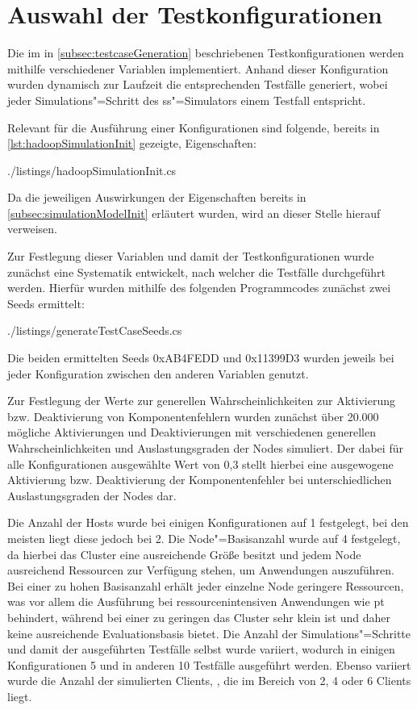 \section{Auswahl der Testkonfigurationen}
\label{sec:selectTestcases}

Die im in \autoref{subsec:testcaseGeneration} beschriebenen Testkonfigurationen werden mithilfe verschiedener Variablen implementiert.
Anhand dieser Konfiguration wurden dynamisch zur Laufzeit die entsprechenden Testfälle generiert, wobei jeder Simulations"=Schritt des \ac{ss}"=Simulators einem Testfall entspricht.

Relevant für die Ausführung einer Konfigurationen sind folgende, bereits in \autoref{lst:hadoopSimulationInit} gezeigte, Eigenschaften:


{./listings/hadoopSimulationInit.cs}

Da die jeweiligen Auswirkungen der Eigenschaften bereits in \autoref{subsec:simulationModelInit} erläutert wurden, wird an dieser Stelle hierauf verweisen.

Zur Festlegung dieser Variablen und damit der Testkonfigurationen wurde zunächst eine Systematik entwickelt, nach welcher die Testfälle durchgeführt werden.
Hierfür wurden mithilfe des folgenden Programmcodes zunächst zwei Seeds ermittelt:


{./listings/generateTestCaseSeeds.cs}

Die beiden ermittelten Seeds 0xAB4FEDD und 0x11399D3 wurden jeweils bei jeder Konfiguration zwischen den anderen Variablen genutzt.

Zur Festlegung der Werte zur generellen Wahrscheinlichkeiten zur Aktivierung bzw. Deaktivierung von Komponentenfehlern wurden zunächst über 20.000 mögliche Aktivierungen und Deaktivierungen mit verschiedenen generellen Wahrscheinlichkeiten und Auslastungsgraden der Nodes simuliert.
Der dabei für alle Konfigurationen ausgewählte Wert von 0,3 stellt hierbei eine ausgewogene Aktivierung bzw. Deaktivierung der Komponentenfehler bei unterschiedlichen Auslastungsgraden der Nodes dar.

Die Anzahl der Hosts wurde bei einigen Konfigurationen auf 1 festgelegt, bei den meisten liegt diese jedoch bei 2.
Die Node"=Basisanzahl wurde auf 4 festgelegt, da hierbei das Cluster eine ausreichende Größe besitzt und jedem Node ausreichend Ressourcen zur Verfügung stehen, um Anwendungen auszuführen.
Bei einer zu hohen Basisanzahl erhält jeder einzelne Node geringere Ressourcen, was vor allem die Ausführung bei ressourcenintensiven Anwendungen wie \zB \acl{pt} behindert, während bei einer zu geringen das Cluster sehr klein ist und daher keine ausreichende Evaluationsbasis bietet.
Die Anzahl der Simulations"=Schritte und damit der ausgeführten Testfälle selbst wurde variiert, wodurch in einigen Konfigurationen 5 und in anderen 10 Testfälle ausgeführt werden.
Ebenso variiert wurde die Anzahl der simulierten Clients, , die im Bereich von 2, 4 oder 6 Clients liegt.

